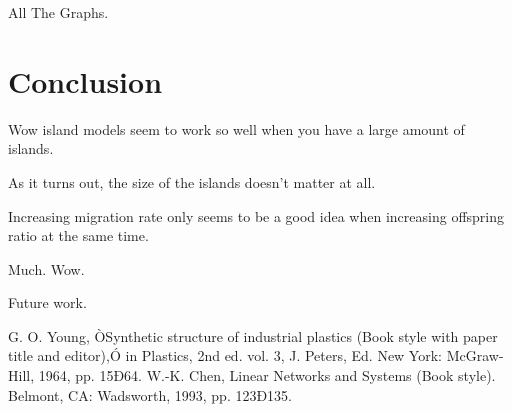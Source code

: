 \documentclass[letterpaper, 10 pt, conference]{ieeeconf}  %
\begin{document}
All The Graphs.

\section{Conclusion}

Wow island models seem to work so well when you have a large amount of islands.

As it turns out, the size of the islands doesn't matter at all.

Increasing migration rate only seems to be a good idea when increasing offspring ratio at the same time.

Much. Wow.

Future work.







\addtolength{\textheight}{-12cm}   %








\begin{thebibliography}{99}

 G. O. Young, ÒSynthetic structure of industrial plastics (Book style with paper title and editor),Ó 	in Plastics, 2nd ed. vol. 3, J. Peters, Ed.  New York: McGraw-Hill, 1964, pp. 15Ð64.
 W.-K. Chen, Linear Networks and Systems (Book style).	Belmont, CA: Wadsworth, 1993, pp. 123Ð135.
\end{thebibliography}
\end{document}
